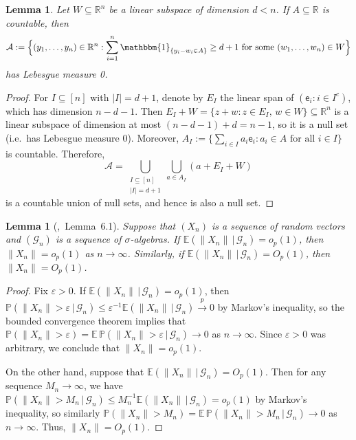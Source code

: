 \documentclass[a4paper]{article}
\newcommand{\R}{\mathbb{R}}
\newcommand{\E}{\mathbb{E}}
\renewcommand{\Pr}{\mathbb{P}}
\newcommand{\Ind}{\mathbbm{1}}
\newcommand{\norm}[1]{\|{#1}\|}
\newcommand{\cvp}{\overset{p}{\to}}
\newtheorem{lemma}[theorem]{Lemma}
\theoremstyle{definition}
\begin{document}
\begin{lemma}
\label{lem:subspace-countable}
Let $W \subseteq \R^n$ be a linear subspace of dimension $d < n$. If $A \subseteq \R$ is countable, then
\[
\mathcal{A} := \Bigl\{(y_1,\dotsc,y_n) \in \R^n : \sum_{i=1}^n \Ind_{\{y_i - w_i \in A\}} \geq d + 1 \text{ for some } (w_1,\dotsc,w_n) \in W\Bigr\}
\]
has Lebesgue measure 0.
\end{lemma}

\begin{proof}
For $I \subseteq [n]$ with $|I| = d + 1$, denote by $E_I$ the linear span of $(\mathsf{e}_i : i \in I^c)$, which has dimension $n - d - 1$. Then $E_I + W = \{z + w : z \in E_I,\,w \in W\} \subseteq \R^n$ is a linear subspace of dimension at most $(n - d - 1) + d = n - 1$, so it is a null set (i.e.~has Lebesgue measure 0). Moreover, $A_I := \{\sum_{i \in I}a_i\mathsf{e}_i : a_i \in A \text{ for all }i \in I\}$ is countable. Therefore,
\[
\mathcal{A} = \bigcup_{\substack{I \subseteq [n] \\ |I| = d+1}}\bigcup_{a \in A_I} (a + E_I + W)
\]
is a countable union of null sets, and hence is also a null set.
\end{proof}

\begin{lemma}[\citealp{chernozhukov2018double},~Lemma~6.1]
\label{lem:cond-cvg}
Suppose that $(X_n)$ is a sequence of random vectors and $(\mathcal{G}_n)$ is a sequence of $\sigma$-algebras. If $\E(\norm{X_n}\,|\,\mathcal{G}_n) = o_p(1)$, then $\norm{X_n} = o_p(1)$ as $n \to \infty$. Similarly, if $\E(\norm{X_n}\,|\,\mathcal{G}_n) = O_p(1)$, then $\norm{X_n} = O_p(1)$.
\end{lemma}

\begin{proof}
Fix $\varepsilon > 0$. If $\E(\norm{X_n}\,|\,\mathcal{G}_n) = o_p(1)$, then $\Pr(\norm{X_n} > \varepsilon\,|\,\mathcal{G}_n) \leq \varepsilon^{-1}\E(\norm{X_n}\,|\,\mathcal{G}_n) \cvp 0$ by Markov's inequality, so the bounded convergence theorem implies that $\Pr(\norm{X_n} > \varepsilon) = \E\,\Pr(\norm{X_n} > \varepsilon\,|\,\mathcal{G}_n) \to 0$ as $n \to \infty$. Since $\varepsilon > 0$ was arbitrary, we conclude that $\norm{X_n} = o_p(1)$. 

On the other hand, suppose that $\E(\norm{X_n}\,|\,\mathcal{G}_n) = O_p(1)$. Then for any sequence $M_n \to \infty$, we have $\Pr(\norm{X_n} > M_n\,|\,\mathcal{G}_n) \leq M_n^{-1}\E(\norm{X_n}\,|\,\mathcal{G}_n) = o_p(1)$ by Markov's inequality, so similarly $\Pr(\norm{X_n} > M_n) = \E\,\Pr(\norm{X_n} > M_n\,|\,\mathcal{G}_n) \to 0$ as $n \to \infty$. Thus, $\norm{X_n} = O_p(1)$. 
\end{proof}
\end{document}
